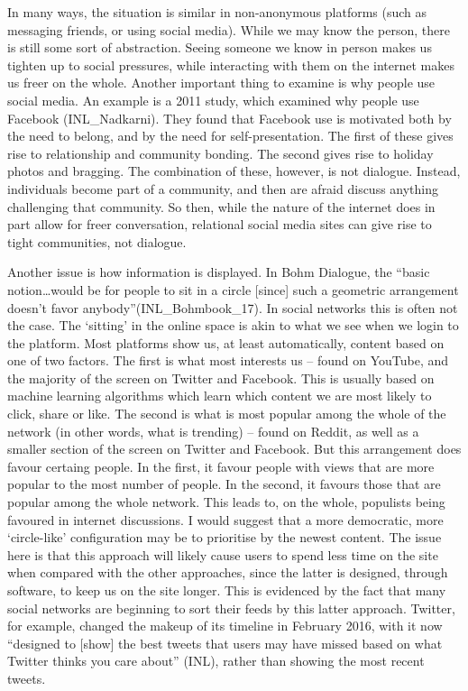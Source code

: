 \documentclass[]{article}
\begin{document}
In many ways, the situation is similar in non-anonymous platforms (such
as messaging friends, or using social media). While we may know the
person, there is still some sort of abstraction. Seeing someone we know
in person makes us tighten up to social pressures, while interacting
with them on the internet makes us freer on the whole. Another important
thing to examine is why people use social media. An example is a 2011
study, which examined why people use Facebook (INL\_Nadkarni). They
found that Facebook use is motivated both by the need to belong, and by
the need for self-presentation. The first of these gives rise to
relationship and community bonding. The second gives rise to holiday
photos and bragging. The combination of these, however, is not dialogue.
Instead, individuals become part of a community, and then are afraid
discuss anything challenging that community. So then, while the nature
of the internet does in part allow for freer conversation, relational
social media sites can give rise to tight communities, not dialogue.

Another issue is how information is displayed. In Bohm Dialogue, the
``basic notion\ldots{}would be for people to sit in a circle {[}since{]}
such a geometric arrangement doesn't favor anybody''(INL\_Bohmbook\_17).
In social networks this is often not the case. The `sitting' in the
online space is akin to what we see when we login to the platform. Most
platforms show us, at least automatically, content based on one of two
factors. The first is what most interests us -- found on YouTube, and
the majority of the screen on Twitter and Facebook. This is usually
based on machine learning algorithms which learn which content we are
most likely to click, share or like. The second is what is most popular
among the whole of the network (in other words, what is trending) --
found on Reddit, as well as a smaller section of the screen on Twitter
and Facebook. But this arrangement does favour certaing people. In the
first, it favour people with views that are more popular to the most
number of people. In the second, it favours those that are popular among
the whole network. This leads to, on the whole, populists being favoured
in internet discussions. I would suggest that a more democratic, more
`circle-like' configuration may be to prioritise by the newest content.
The issue here is that this approach will likely cause users to spend
less time on the site when compared with the other approaches, since the
latter is designed, through software, to keep us on the site longer.
This is evidenced by the fact that many social networks are beginning to
sort their feeds by this latter approach. Twitter, for example, changed
the makeup of its timeline in February 2016, with it now ``designed to
{[}show{]} the best tweets that users may have missed based on what
Twitter thinks you care about'' (INL), rather than showing the most
recent tweets.
\end{document}
